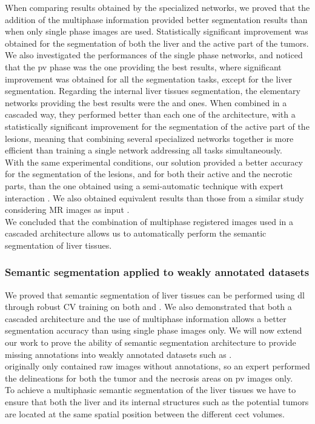 When comparing results obtained by the specialized networks, we proved
that the addition of the multiphase information provided better
segmentation results than when only single phase images are used.
Statistically significant improvement was obtained for the segmentation
of both the liver and the active part of the tumors.
We also investigated the performances of the single phase networks, and
noticed that the \ac{pv} phase was the one providing the best results,
where significant improvement was obtained for all the segmentation
tasks, except for the liver segmentation.
Regarding the internal liver tissues segmentation, the elementary
networks providing the best results were the  
and  ones. When combined in a cascaded way, 
they performed better than each one of the  architecture, 
with a statistically significant improvement
for the segmentation of the active part of the lesions, meaning that 
combining several specialized networks together is more efficient 
than training a single network addressing all tasks simultaneously.\\
With the same experimental conditions, our solution provided a better
accuracy for the segmentation of the lesions, and for both their active
and the necrotic parts, than the one obtained using a semi-automatic
technique with expert interaction \cite{Ouhmich2019,Conze2017}. We also
obtained equivalent results than those from a similar study considering
MR images as input \cite{Zhang2018}.\\
We concluded that the combination of multiphase registered images used in a 
cascaded architecture allows us to automatically perform the semantic segmentation of liver tissues.


\subsubsection{Semantic segmentation applied to weakly annotated datasets}

We proved that semantic segmentation of liver tissues can be
performed using \ac{dl} through robust CV training on both \textbf{} and
\textbf{}.
We also demonstrated that both a cascaded architecture and the use of
multiphase information allows a better segmentation accuracy than using
single phase images only.
We will now extend our work to prove the ability of semantic segmentation architecture to provide missing annotations into weakly annotated datasets such as \textbf{}.\\
\textbf{} originally only
contained raw images without annotations, so an expert performed the
delineations for both the tumor and the necrosis areas on \ac{pv} images only. \\
To achieve a multiphasic semantic segmentation of the liver tissues we
have to ensure that both the liver and its internal structures such as
the potential tumors are located at the same spatial position between
the different \ac{cect} volumes.


